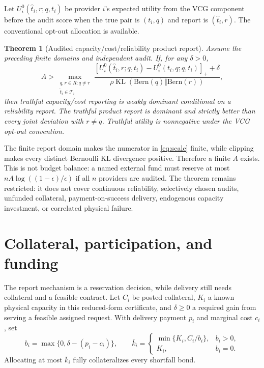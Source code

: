 \documentclass[11pt]{article}
\newtheorem{theorem}{Theorem}
\theoremstyle{definition}
\newcommand{\KL}{\operatorname{KL}}
\begin{document}
Let $U_i^0(\hat t_i,r;q,t_i)$ be provider $i$'s expected utility from the VCG
component before the audit score when the true pair is $(t_i,q)$ and report is
$(\hat t_i,r)$. The conventional opt-out allocation is available.

\begin{theorem}[Audited capacity/cost/reliability product report]
\label{thm:audited}
Assume the preceding finite domains and independent audit. If, for any
$\delta>0$,
\begin{equation}
\label{eq:scale}
 A>
 \max_{\substack{q,r\in R:q\ne r\\\hat t_i\in\mathcal T_i}}
 \frac{
 [U_i^0(\hat t_i,r;q,t_i)-U_i^0(t_i,q;q,t_i)]_++\delta
 }{
 \rho\KL(\mathrm{Bern}(q)\Vert\mathrm{Bern}(r))
 },
\end{equation}
then truthful capacity/cost reporting is weakly dominant conditional on a
reliability report. The truthful product report is dominant and strictly
better than every joint deviation with $r\ne q$. Truthful utility is
nonnegative under the VCG opt-out convention.
\end{theorem}

The finite report domain makes the numerator in \cref{eq:scale} finite, while
clipping makes every distinct Bernoulli KL divergence positive. Therefore a
finite $A$ exists. This is not budget balance: a named external fund must
reserve at most $nA\log((1-\epsilon)/\epsilon)$ if all $n$ providers are
audited. The theorem remains restricted: it does not cover continuous
reliability, selectively chosen audits, unfunded collateral, payment-on-success
delivery, endogenous capacity investment, or correlated physical failure.

\section{Collateral, participation, and funding}
\label{sec:funding}

The report mechanism is a reservation decision, while delivery still needs
collateral and a feasible contract. Let $C_i$ be posted collateral, $K_i$ a
known physical capacity in this reduced-form certificate, and $\delta\geq0$ a
required gain from serving a feasible assigned request. With delivery payment
$p_i$ and marginal cost $c_i$, set
\[
 b_i=\max\{0,\delta-(p_i-c_i)\},\qquad
 \bar k_i=
 \begin{cases}
 \min\{K_i,C_i/b_i\},&b_i>0,\\
 K_i,&b_i=0.
 \end{cases}
\]
Allocating at most $\bar k_i$ fully collateralizes every shortfall bond.
\end{document}
